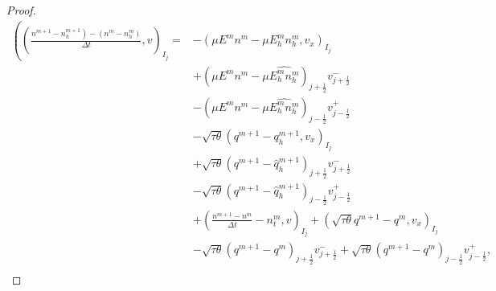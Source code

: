 \begin{proof}
    $$
        \begin{aligned}
            \left(\left(\frac{\left.n^{m+1}-n_{h}^{m+1}\right)-\left(n^{m}-n_{h}^{m}\right)}{\Delta t}, v\right)_{I_{j}}=\right. & -\left(\mu E^{m} n^{m}-\mu E_{h}^{m} n_{h}^{m}, v_{x}\right)_{I_{j}}                                                                                                    \\
                                                                                                                                 & +\left(\mu E^{m} n^{m}-\mu \widehat{E_{h}^{m} n_{h}^{m}}\right)_{j+\frac{1}{2}} v_{j+\frac{1}{2}}^{-}                                                                   \\
                                                                                                                                 & -\left(\mu E^{m} n^{m}-\mu \widehat{E_{h}^{m} n_{h}^{m}}\right)_{j-\frac{1}{2}} v_{j-\frac{1}{2}}^{+}                                                                   \\
                                                                                                                                 & -\sqrt{\tau \theta}\left(q^{m+1}-q_{h}^{m+1}, v_{x}\right)_{I_{j}}                                                                                                      \\
                                                                                                                                 & +\sqrt{\tau \theta}\left(q^{m+1}-\hat{q}_{h}^{m+1}\right)_{j+\frac{1}{2}} v_{j+\frac{1}{2}}^{-}                                                                         \\
                                                                                                                                 & -\sqrt{\tau \theta}\left(q^{m+1}-\hat{q}_{h}^{m+1}\right)_{j-\frac{1}{2}} v_{j-\frac{1}{2}}^{+}                                                                         \\
                                                                                                                                 & +\left(\frac{n^{m+1}-n^{m}}{\Delta t}-n_{t}^{m}, v\right)_{I_{j}}+\left(\sqrt{\tau \theta} q^{m+1}-q^{m}, v_{x}\right)_{I_{j}}                                          \\
                                                                                                                                 & -\sqrt{\tau \theta}\left(q^{m+1}-q^{m}\right)_{j+\frac{1}{2}} v_{j+\frac{1}{2}}^{-}+\sqrt{\tau \theta}\left(q^{m+1}-q^{m}\right)_{j-\frac{1}{2}} v_{j-\frac{1}{2}}^{+}, \\

\end{aligned}$$
\end{proof}
